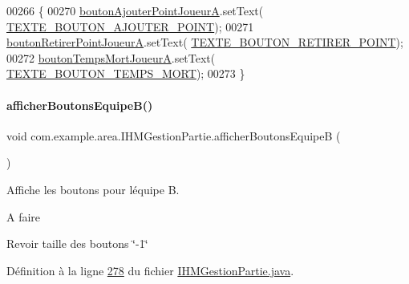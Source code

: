 \begin{DoxyCode}
00266     \{
00270         \hyperlink{classcom_1_1example_1_1area_1_1_i_h_m_gestion_partie_aa99f420624fb6c990516b30ebe0805cc}{boutonAjouterPointJoueurA}.setText(
      \hyperlink{classcom_1_1example_1_1area_1_1_i_h_m_gestion_partie_a29eb33d17f8f318937bd01705f5769d8}{TEXTE\_BOUTON\_AJOUTER\_POINT});
00271         \hyperlink{classcom_1_1example_1_1area_1_1_i_h_m_gestion_partie_af59fb470e464a16a7f09f4440b18c2e8}{boutonRetirerPointJoueurA}.setText(
      \hyperlink{classcom_1_1example_1_1area_1_1_i_h_m_gestion_partie_a9218ba4464b7631738927d74539ac927}{TEXTE\_BOUTON\_RETIRER\_POINT});
00272         \hyperlink{classcom_1_1example_1_1area_1_1_i_h_m_gestion_partie_a1014526b0dcc0266e184dc2787fbeeef}{boutonTempsMortJoueurA}.setText(
      \hyperlink{classcom_1_1example_1_1area_1_1_i_h_m_gestion_partie_abc36e82bb3c4a2fb719305ea9e525c9b}{TEXTE\_BOUTON\_TEMPS\_MORT});
00273     \}
\end{DoxyCode}
\mbox{\label{classcom_1_1example_1_1area_1_1_i_h_m_gestion_partie_a00c0111f1b2d4d1161515e2c04ca645c}} 
\paragraph{\texorpdfstring{afficher\+Boutons\+Equipe\+B()}{afficherBoutonsEquipeB()}}
{\footnotesize\ttfamily void com.\+example.\+area.\+I\+H\+M\+Gestion\+Partie.\+afficher\+Boutons\+EquipeB (\begin{DoxyParamCaption}{ }\end{DoxyParamCaption})\hspace{0.3cm}{\ttfamily [private]}}



Affiche les boutons pour l\textquotesingle{}équipe B. 

\begin{DoxyRefDesc}{A faire}
\item[\hyperlink{todo__todo000002}{A faire}]Revoir taille des boutons \char`\"{}-\/1\char`\"{} \end{DoxyRefDesc}


Définition à la ligne \hyperlink{_i_h_m_gestion_partie_8java_source_l00278}{278} du fichier \hyperlink{_i_h_m_gestion_partie_8java_source}{I\+H\+M\+Gestion\+Partie.\+java}.



